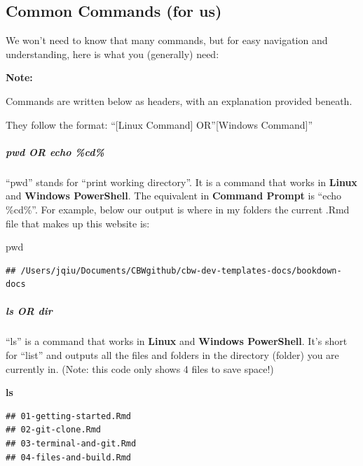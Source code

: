 \documentclass[
]{book}
\newenvironment{Shaded}{\begin{snugshade}}{\end{snugshade}}
\newcommand{\BuiltInTok}[1]{#1}
\newcommand{\FunctionTok}[1]{\textcolor[rgb]{0.13,0.29,0.53}{\textbf{#1}}}
\newenvironment{greenbox}{
  \definecolor{shadecolor}{RGB}{141, 181, 128}
  \color{white}
  \begin{shaded}}
 {\end{shaded}}
\theoremstyle{definition}
\theoremstyle{definition}
\theoremstyle{definition}
\theoremstyle{definition}
\theoremstyle{remark}
\begin{document}
\subsection{Common Commands (for us)}\label{common-commands-for-us}

We won't need to know that many commands, but for easy navigation and understanding, here is what you (generally) need:

\begin{greenbox}
\textbf{Note:}

Commands are written below as headers, with an explanation provided beneath.

They follow the format: ``{[}Linux Command{]} OR''{[}Windows Command{]}''

\end{greenbox}

\subparagraph*{pwd OR echo \%cd\%}\label{pwd-or-echo-cd}

``pwd'' stands for ``print working directory''. It is a command that works in \textbf{Linux} and \textbf{Windows PowerShell}. The equivalent in \textbf{Command Prompt} is ``echo \%cd\%''. For example, below our output is where in my folders the current .Rmd file that makes up this website is:

\begin{Shaded}
\begin{Highlighting}[]
\BuiltInTok{pwd}
\end{Highlighting}
\end{Shaded}

\begin{verbatim}
## /Users/jqiu/Documents/CBWgithub/cbw-dev-templates-docs/bookdown-docs
\end{verbatim}

\subparagraph*{ls OR dir}\label{ls-or-dir}

``ls'' is a command that works in \textbf{Linux} and \textbf{Windows PowerShell}. It's short for ``list'' and outputs all the files and folders in the directory (folder) you are currently in. (Note: this code only shows 4 files to save space!)

\begin{Shaded}
\begin{Highlighting}[]
\FunctionTok{ls}
\end{Highlighting}
\end{Shaded}

\begin{verbatim}
## 01-getting-started.Rmd
## 02-git-clone.Rmd
## 03-terminal-and-git.Rmd
## 04-files-and-build.Rmd
\end{verbatim}
\end{document}
